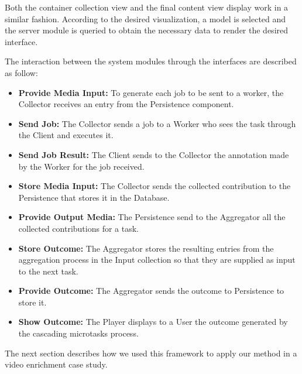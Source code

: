 Both the container collection view and the final content view display work in a similar fashion. According to the desired visualization, a model is selected and the server module is queried to obtain the necessary data to render the desired interface. 






The interaction between the system modules through the interfaces are described as follow:
\begin{itemize}
\item \textbf{Provide Media Input:} To generate each job to be sent to a worker, the Collector receives an entry from the Persistence component.

\item \textbf{Send Job:} The Collector sends a job to a Worker who sees the task through the Client and executes it.

\item \textbf{Send Job Result:} The Client sends to the Collector the annotation made by the Worker for the job received.

\item \textbf{Store Media Input:} The Collector sends the collected contribution to the Persistence that stores it in the Database.

\item \textbf{Provide Output Media:} The Persistence send to the Aggregator all the collected contributions for a task.

\item \textbf{Store Outcome:} The Aggregator stores the resulting entries from the aggregation process in the Input collection so that they are supplied as input to the next task.

\item \textbf{Provide Outcome:} The Aggregator sends the outcome to Persistence to store it.

\item \textbf{Show Outcome:} The Player displays to a User the outcome generated by the cascading microtasks process.

\end{itemize}

The next section describes how we used this framework to apply our method in a video enrichment case study.















